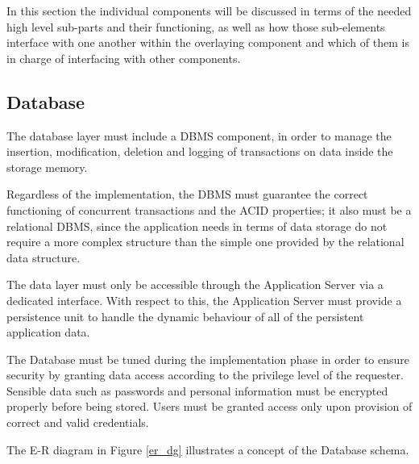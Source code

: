 In this section the individual components will be discussed in terms of the needed high level sub-parts and their functioning, as well as how those sub-elements interface with one another within the overlaying component and which of them is in charge of interfacing with other components.

\subsection{Database}
The database layer must include a DBMS component, in order to manage the insertion, modification, deletion and logging of transactions on data inside the storage memory.

Regardless of the implementation, the DBMS must guarantee the correct functioning of concurrent transactions and the ACID properties; it also must be a relational DBMS, since the application needs in terms of data storage do not require a more complex structure than the simple one provided by the relational data structure.

The data layer must only be accessible through the Application Server via a dedicated interface. With respect to this, the Application Server must provide a persistence unit to handle the dynamic behaviour of all of the persistent application data.

The Database must be tuned during the implementation phase in order to ensure security by granting data access according to the privilege level of the requester. Sensible data such as passwords and personal information must be encrypted properly before being stored. Users must be granted access only upon provision of correct and valid credentials.

The E-R diagram in Figure \ref{er_dg} illustrates a concept of the Database schema.

